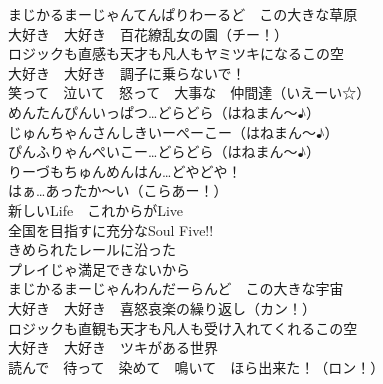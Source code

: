 {まじかるまーじゃんてんぱりわーるど　この大きな草原\\
大好き　大好き　百花繚乱女の園（チー！）\\
ロジックも直感も天才も凡人もヤミツキになるこの空\\
大好き　大好き　調子に乗らないで！\\
笑って　泣いて　怒って　大事な　仲間達（いえーい☆）\\

めんたんぴんいっぱつ…どらどら（はねまん〜♪）\\
じゅんちゃんさんしきいーぺーこー（はねまん〜♪）\\
ぴんふりゃんぺいこー…どらどら（はねまん〜♪）\\
りーづもちゅんめんはん…どやどや！\\
はぁ…あったか〜い（こらあー！）\\

新しいLife　これからがLive\\
全国を目指すに充分なSoul Five!!\\
きめられたレールに沿った\\
プレイじゃ満足できないから\\

まじかるまーじゃんわんだーらんど　この大きな宇宙\\
大好き　大好き　喜怒哀楽の繰り返し（カン！）\\
ロジックも直観も天才も凡人も受け入れてくれるこの空\\
大好き　大好き　ツキがある世界\\
読んで　待って　染めて　鳴いて　ほら出来た！（ロン！）
}


